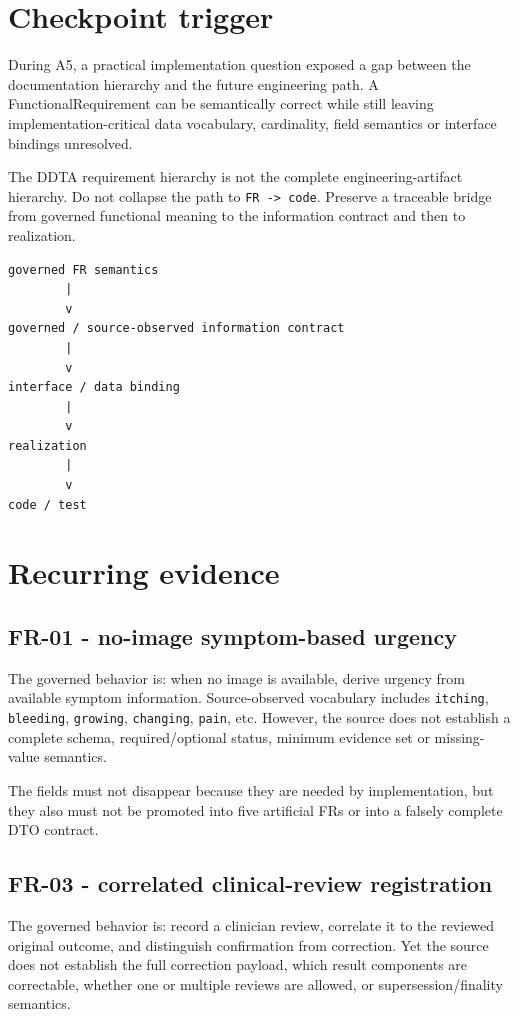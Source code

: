 \documentclass[11pt,a4paper]{article}
\begin{document}
\section{Checkpoint trigger}
During A5, a practical implementation question exposed a gap between the documentation hierarchy and the future engineering path. A FunctionalRequirement can be semantically correct while still leaving implementation-critical data vocabulary, cardinality, field semantics or interface bindings unresolved.

\begin{ddtacore}[title={Core finding}]
The DDTA requirement hierarchy is not the complete engineering-artifact hierarchy. Do not collapse the path to \texttt{FR -> code}. Preserve a traceable bridge from governed functional meaning to the information contract and then to realization.
\end{ddtacore}

\begin{lstlisting}
governed FR semantics
        |
        v
governed / source-observed information contract
        |
        v
interface / data binding
        |
        v
realization
        |
        v
code / test
\end{lstlisting}

\section{Recurring evidence}
\subsection{FR-01 - no-image symptom-based urgency}
The governed behavior is: when no image is available, derive urgency from available symptom information. Source-observed vocabulary includes \texttt{itching}, \texttt{bleeding}, \texttt{growing}, \texttt{changing}, \texttt{pain}, etc. However, the source does not establish a complete schema, required/optional status, minimum evidence set or missing-value semantics.

\begin{ddtaopen}[title={FR-01 information-contract gap}]
The fields must not disappear because they are needed by implementation, but they also must not be promoted into five artificial FRs or into a falsely complete DTO contract.
\end{ddtaopen}

\subsection{FR-03 - correlated clinical-review registration}
The governed behavior is: record a clinician review, correlate it to the reviewed original outcome, and distinguish confirmation from correction. Yet the source does not establish the full correction payload, which result components are correctable, whether one or multiple reviews are allowed, or supersession/finality semantics.
\end{document}
